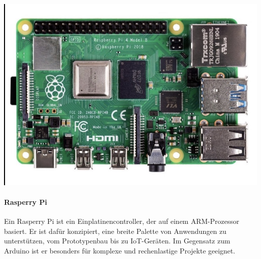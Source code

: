 \begin{minipage}{0.3\textwidth}
	\includegraphics [width=\textwidth] {img/RasperryPi}
\end{minipage}
\begin{minipage}{0.7\textwidth}
	\paragraph{Rasperry Pi}
	Ein Rasperry Pi ist ein Einplatinencontroller, der auf einem ARM-Prozessor basiert.
	Er ist dafür konzipiert, eine breite Palette von Anwendungen zu unterstützen, vom Prototypenbau bis zu IoT-Geräten. %
	Im Gegensatz zum Arduino ist er besonders für komplexe und rechenlastige Projekte geeignet.
\end{minipage}
\newline

